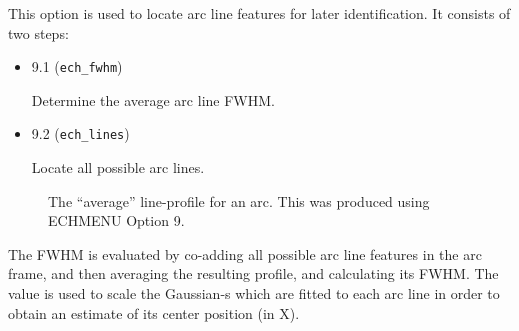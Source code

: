 



This option is used to locate arc line features for later identification.
It consists of two steps:

\begin{itemize}

\item {} {9.1} (\verb+ech_fwhm+)

      Determine the average arc line FWHM. 

\item {} {9.2} (\verb+ech_lines+)

      Locate all possible arc lines.

\end{itemize}

\begin{figure}
\begin{center}
{\leavevmode\epsfysize=136mm}

\parbox{140mm}{
\caption{The ``average'' line-profile for an arc.  This was produced using
ECHMENU Option 9.}
\label{fi_linewidth}
}
\end{center}
\end{figure}

The FWHM is evaluated by co-adding all possible arc line features in the
arc frame, and then averaging the resulting profile, and calculating its
FWHM. The value is used to scale the Gaussian-s which are fitted to each
arc line in order to obtain an estimate of its center position (in X).


